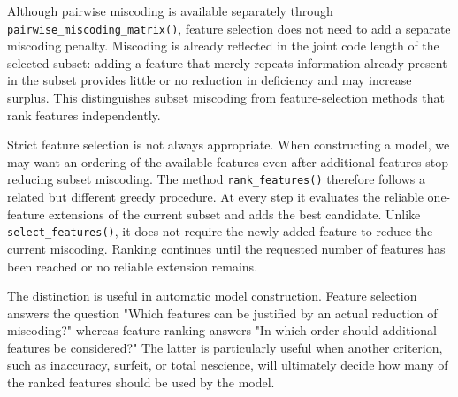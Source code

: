 Although pairwise miscoding is available separately through \texttt{pairwise\_miscoding\_matrix()}, feature selection does not need to add a separate miscoding penalty. Miscoding is already reflected in the joint code
length of the selected subset: adding a feature that merely repeats information already present in the subset provides little or no reduction in deficiency and may increase surplus. This distinguishes subset miscoding from feature-selection methods that rank features independently.

Strict feature selection is not always appropriate. When constructing a model, we may want an ordering of the available features even after additional features stop reducing subset miscoding. The method \texttt{rank\_features()} therefore follows a related but different greedy procedure. At every step it evaluates the reliable one-feature extensions of the current subset and adds the best candidate. Unlike \texttt{select\_features()}, it does not require the newly added feature to reduce the current miscoding. Ranking continues until the requested number of features has been reached or no reliable extension remains.

The distinction is useful in automatic model construction. Feature selection answers the question "Which features can be justified by an actual reduction of miscoding?" whereas feature ranking answers "In which order should additional features be considered?" The latter is particularly useful when another criterion, such as inaccuracy, surfeit, or total nescience, will ultimately decide how many of the ranked features should be used by the model.

